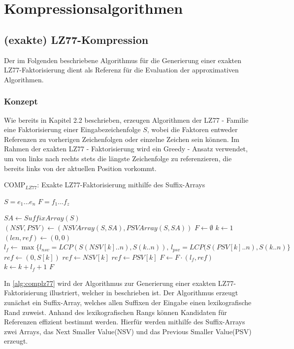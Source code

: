 \chapter{Kompressionsalgorithmen}

\section{(exakte) LZ77-Kompression}
Der im Folgenden beschriebene Algorithmus für die Generierung einer exakten LZ77-Faktorisierung dient als Referenz für die Evaluation der approximativen Algorithmen.

\subsection{Konzept}
Wie bereits in Kapitel 2.2 beschrieben, erzeugen Algorithmen der LZ77 - Familie eine Faktorisierung einer Eingabezeichenfolge $S$, wobei die Faktoren entweder Referenzen
zu vorherigen Zeichenfolgen oder einzelne Zeichen sein können. Im Rahmen der exakten LZ77 - Faktorisierung wird ein Greedy - Ansatz verwendet, um von links nach rechts 
stets die längste Zeichenfolge zu referenzieren, die bereits links von der aktuellen Position vorkommt.
\begin{algorithm}[ht]
\centering
\caption{COMP$_{LZ77}$: Exakte LZ77-Faktorisierung mithilfe des Suffix-Arrays} \label{alg:complz77}
\algorithmicrequire $S=e_1...e_n$
\algorithmicensure $F=f_1...f_z$
\begin{algorithmic}
    \STATE $SA \gets SuffixArray(S)$
    \STATE $(NSV, PSV) \gets (NSVArray(S, SA), PSVArray(S, SA))$
    \STATE $F \gets \emptyset$
    \STATE $k \gets 1$
    \STATE $(len, ref) \gets (0, 0)$
    \STATE $l_{f} \gets \max\{l_{nsv}=LCP(S(NSV[k]..n), S(k..n))\text{, } l_{psv}=LCP(S(PSV[k]..n), S(k..n)\}$
        \STATE $ref \gets (0, S[k])$
        \STATE $ref \gets NSV[k]$
    \ELSE
        \STATE $ref \gets PSV[k]$
    \ENDIF
    \STATE $F \gets F \cdot (l_f, ref)$
    \STATE $k \gets k + l_f + 1$
    \ENDWHILE
    \RETURN $F$
\end{algorithmic}
\end{algorithm}
In \ref{alg:complz77} wird der Algorithmus zur Generierung einer exakten LZ77-Faktorisierung illustriert, welcher in \cite{exactLemZiv} beschrieben ist. Der 
Algorithmus erzeugt zunächst ein Suffix-Array, welches allen Suffixen der Eingabe einen lexikografische Rand zuweist. Anhand des lexikografischen Rangs 
können Kandidaten für Referenzen effizient bestimmt werden. Hierfür werden mithilfe des Suffix-Arrays zwei Arrays, das Next Smaller Value(NSV) und das 
Previous Smaller Value(PSV) erzeugt.

